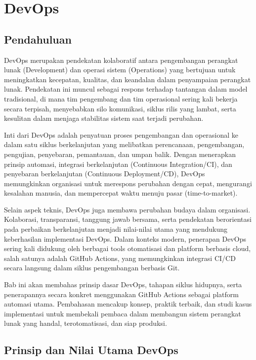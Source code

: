 \chapter{DevOps}

\section{Pendahuluan}

DevOps merupakan pendekatan kolaboratif antara pengembangan perangkat lunak (Development) dan operasi sistem (Operations) yang bertujuan untuk meningkatkan kecepatan, kualitas, dan keandalan dalam penyampaian perangkat lunak. Pendekatan ini muncul sebagai respons terhadap tantangan dalam model tradisional, di mana tim pengembang dan tim operasional sering kali bekerja secara terpisah, menyebabkan silo komunikasi, siklus rilis yang lambat, serta kesulitan dalam menjaga stabilitas sistem saat terjadi perubahan.

Inti dari DevOps adalah penyatuan proses pengembangan dan operasional ke dalam satu siklus berkelanjutan yang melibatkan perencanaan, pengembangan, pengujian, penyebaran, pemantauan, dan umpan balik. Dengan menerapkan prinsip automasi, integrasi berkelanjutan (Continuous Integration/CI), dan penyebaran berkelanjutan (Continuous Deployment/CD), DevOps memungkinkan organisasi untuk merespons perubahan dengan cepat, mengurangi kesalahan manusia, dan mempercepat waktu menuju pasar (time-to-market).

Selain aspek teknis, DevOps juga membawa perubahan budaya dalam organisasi. Kolaborasi, transparansi, tanggung jawab bersama, serta pendekatan berorientasi pada perbaikan berkelanjutan menjadi nilai-nilai utama yang mendukung keberhasilan implementasi DevOps. Dalam konteks modern, penerapan DevOps sering kali didukung oleh berbagai tools otomatisasi dan platform berbasis cloud, salah satunya adalah GitHub Actions, yang memungkinkan integrasi CI/CD secara langsung dalam siklus pengembangan berbasis Git.

Bab ini akan membahas prinsip dasar DevOps, tahapan siklus hidupnya, serta penerapannya secara konkret menggunakan GitHub Actions sebagai platform automasi utama. Pembahasan mencakup konsep, praktik terbaik, dan studi kasus implementasi untuk membekali pembaca dalam membangun sistem perangkat lunak yang handal, terotomatisasi, dan siap produksi.

\section{Prinsip dan Nilai Utama DevOps}

